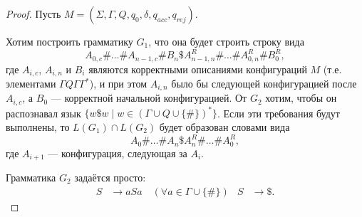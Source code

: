 \documentclass[12pt,a4paper]{article}
\begin{document}
    \begin{proof}
        Пусть $M = (\Sigma, \Gamma, Q, q_0, \delta, q_{acc}, q_{rej})$.

        Хотим построить грамматику $G_1$, что она будет строить строку вида
        \[A_{0,c} \# \dots \# A_{n-1,c} \# B_n \$ A_{n-1,n}^R \# \dots \# A_{0,n}^R \# B_0^R,\]
        где $A_{i, c}$, $A_{i, n}$ и $B_i$ являются корректными описаниями конфигураций $M$ (т.е. элементами $\Gamma Q \Gamma \Gamma^*$), и при этом $A_{i,n}$ было бы следующей конфигурацией после $A_{i,c}$, а $B_0$ --- корректной начальной конфигурацией. От $G_2$ хотим, чтобы он распознавал язык $\{w\$w \mid w \in (\Gamma \cup Q \cup \{\#\})^*\}$. Если эти требования будут выполнены, то $L(G_1) \cap L(G_2)$ будет образован словами вида
        \[A_0 \# \dots \# A_n \$ A_n^R \# \dots \# A_0^R,\]
        где $A_{i+1}$ --- конфигурация, следующая за $A_i$.

        Грамматика $G_2$ задаётся просто:
        \begin{align*}
            S &\to aSa \quad (\forall a \in \Gamma \cup \{\#\})&
            S &\to \$.
        \end{align*}


\end{proof}
\end{document}
